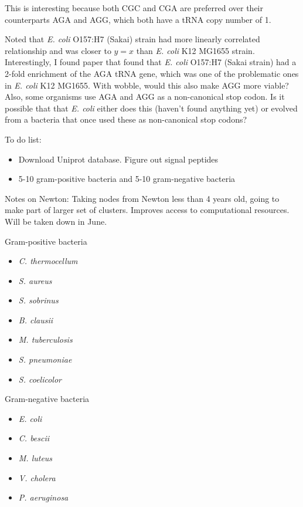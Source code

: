 \documentclass[11pt]{labbook}
\begin{document}
This is interesting because both CGC and CGA are preferred over their counterparts AGA and AGG, which both have a tRNA copy number of 1. 

Noted that \textit{E. coli} O157:H7 (Sakai) strain had more linearly correlated relationship and was closer to $y = x$ than \textit{E. coli} K12 MG1655 strain. Interestingly, I found paper that found that \textit{E. coli} O157:H7 (Sakai strain) had a 2-fold enrichment of the AGA tRNA gene, which was one of the problematic ones in \textit{E. coli} K12 MG1655. With wobble, would this also make AGG more viable? Also, some organisms use AGA and AGG as a non-canonical stop codon. Is it possible that that \textit{E. coli} either does this (haven't found anything yet) or evolved from a bacteria that once used these as non-canonical stop codons? 

To do list:
\begin{itemize}
\item Download Uniprot database. Figure out signal peptides
\item 5-10 gram-positive bacteria and 5-10 gram-negative bacteria
\end{itemize}


Notes on Newton:
Taking nodes from Newton less than 4 years old, going to make part of larger set of clusters. Improves access to computational resources. Will be taken down in June.



Gram-positive bacteria
\begin{itemize}
\item \textit{C. thermocellum}
\item \textit{S. aureus}
\item \textit{S. sobrinus}
\item \textit{B. clausii}
\item \textit{M. tuberculosis}
\item \textit{S. pneumoniae}
\item \textit{S. coelicolor}
\end{itemize}
 
Gram-negative bacteria
\begin{itemize}
\item \textit{E. coli}
\item \textit{C. bescii}
\item \textit{M. luteus}
\item \textit{V. cholera}
\item \textit{P. aeruginosa}
\end{itemize}
\end{document}

